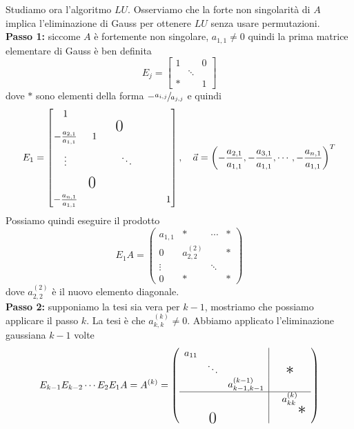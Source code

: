 \documentclass[a4paper]{article}
\begin{document}
Studiamo ora l'algoritmo \(LU\).
Osserviamo che la forte non singolarità di \(A\) implica l'eliminazione di Gauss per ottenere \(LU\) senza usare
permutazioni. \\
\textbf{Passo 1:} siccome \(A\) è fortemente non singolare, \(a_{1,1} \neq 0\) quindi la prima matrice elementare di Gauss è ben definita
\[
    E_j =
    \begin{bmatrix}
        1 & & 0 \\
        & \ddots & \\
        \ast & & 1
    \end{bmatrix}
\]
dove \(\ast\) sono elementi della forma \(-\sfrac{a_{i,j}}{a_{j,j}}\) e quindi
\[
    E_1 =
    \begin{bmatrix}
        1 & & \makebox[0pt][c]{\raisebox{-15pt}{\text{\LARGE 0}}} & \\[2ex]
        -\frac{a_{2,1}}{a_{1,1}} & \hspace{5pt} 1 & & \\[2ex]
        \vdots & & \hspace{15pt} \ddots & \\[2ex]
        -\frac{a_{n,1}}{a_{1,1}} & \makebox[0pt][c]{\raisebox{15pt}{\text{\LARGE 0}}} & & \hspace{25pt} 1
    \end{bmatrix}
    ,\quad \vec a = \left(
        -\frac{a_{2,1}}{a_{1,1}},
        -\frac{a_{3,1}}{a_{1,1}},
        \cdots,
        -\frac{a_{n,1}}{a_{1,1}}
    \right)^T
\]
Possiamo quindi eseguire il prodotto
\[
    E_1A = \left(
        \begin{array}{c|ccc}
            a_{1,1} & \ast & \cdots & \ast \\
            \hline
            0 & a_{2,2}^{(2)} & & \ast \\
            \vdots & & \ddots & \\
            0 & \ast & & \ast
        \end{array}
    \right)
\]
dove \(a_{2,2}^{(2)}\) è il nuovo elemento diagonale. \\
\textbf{Passo 2:} supponiamo la tesi sia vera per \(k-1\), mostriamo che possiamo applicare il passo \(k\).
La tesi è che \(a_{k,k}^{(k)} \neq 0\).
Abbiamo applicato l'eliminazione gaussiana \(k-1\) volte
\[
    E_{k-1} E_{k-2} \cdots E_2E_1 A = A^{(k)} =
    \left(
        \begin{array}{ccc|c}
            a_{11} & & & \\
            & \ddots & & \text{\LARGE $\ast$} \\
            & & a_{k-1,k-1}^{(k-1)} & \\ \hline
            & & & a_{kk}^{(k)} \\
            & \raisebox{-10pt}{\text{\LARGE $0$}} & & \hspace{25pt} \text{\LARGE $\ast$}
        \end{array}
    \right)
\]
\end{document}
